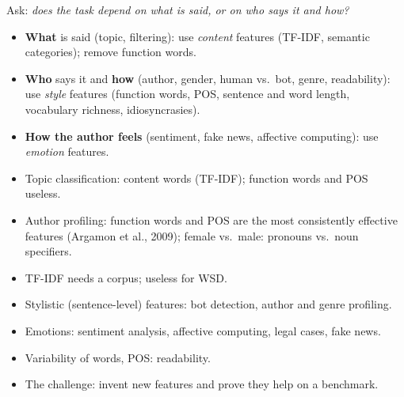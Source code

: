 \begin{nbintuition}
Ask: \emph{does the task depend on what is said, or on who says it and how?}
\begin{itemize}[nosep]
  \item \textbf{What} is said (topic, filtering): use \emph{content} features (TF-IDF,
        semantic categories); remove function words.
  \item \textbf{Who} says it and \textbf{how} (author, gender, human vs.\ bot, genre,
        readability): use \emph{style} features (function words, POS, sentence and word
        length, vocabulary richness, idiosyncrasies).
  \item \textbf{How the author feels} (sentiment, fake news, affective computing): use
        \emph{emotion} features.
\end{itemize}
\end{nbintuition}

\begin{nbsummary}
\begin{itemize}[nosep]
  \item Topic classification: content words (TF-IDF); function words and POS useless.
  \item Author profiling: function words and POS are the most consistently effective
        features (Argamon et al., 2009); female vs.\ male: pronouns vs.\ noun specifiers.
  \item TF-IDF needs a corpus; useless for WSD.
  \item Stylistic (sentence-level) features: bot detection, author and genre profiling.
  \item Emotions: sentiment analysis, affective computing, legal cases, fake news.
  \item Variability of words, POS: readability.
  \item The challenge: invent new features and prove they help on a benchmark.
\end{itemize}
\end{nbsummary}

